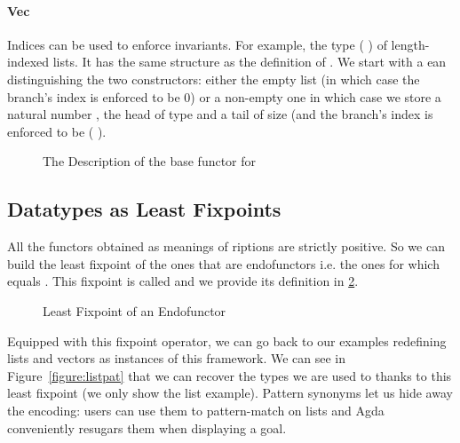 \paragraph{Vec}
Indices can be used to enforce invariants. For example, the type
({  }) of length-indexed lists. It has the
same structure as the definition of .
We start with a ean distinguishing the two constructors: either
the empty list (in which case the branch's index is enforced to be $0$) or a
non-empty one in which case we store a natural number , the head of type
 and a tail of size  (and the branch's index is enforced to be
( ).

\begin{figure}[h]
\begin{minipage}{0.5\textwidth}
\end{minipage}\begin{minipage}{0.5\textwidth}
\end{minipage}

\caption{The Description of the base functor for ~~}\label{figure:vecD}
\end{figure}

\subsection{Datatypes as Least Fixpoints}

All the functors obtained as meanings of riptions are strictly
positive. So we can build the least fixpoint of the ones that are
endofunctors i.e. the ones for which  equals . This fixpoint
is called  and we provide its definition in \cref{figure:datamu}.

\begin{figure}[h]
\caption{Least Fixpoint of an Endofunctor}\label{figure:datamu}
\end{figure}

Equipped with this fixpoint operator, we can go back to our examples
redefining lists and vectors as instances of this framework. We can
see in Figure~\ref{figure:listpat} that we can recover the types we are
used to thanks to this least fixpoint (we only show the list example).
%
Pattern synonyms let us hide away the encoding: users can use them
to pattern-match on lists and Agda conveniently resugars them when
displaying a goal.

